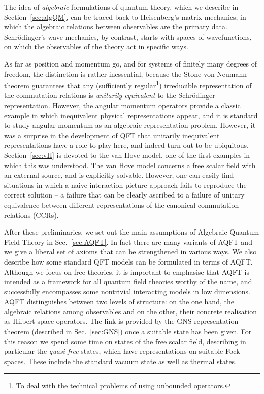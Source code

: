 \documentclass[12pt,a4paper]{article}
\newcommand{\1}{\mathds{1}}                         %
\begin{document}
	The idea of \emph{algebraic} formulations of quantum theory, which we describe in Section~\ref{sec:algQM}, can be traced
	back to Heisenberg's matrix mechanics, in which the algebraic relations between
	observables are the primary data. Schr\"odinger's wave mechanics, by contrast,
	starts with spaces of wavefunctions, on which the observables of the theory act in specific ways.
	
	As far as position and momentum go, and for systems of finitely many degrees of freedom, the distinction is rather inessential, because the Stone-von Neumann theorem guarantees that any (sufficiently regular\footnote{To deal with the technical problems of using unbounded operators.}) irreducible representation
	of the commutation relations is \emph{unitarily equivalent} to the Schr\"odinger representation. However, the angular momentum operators provide a classic example in which inequivalent physical representations appear, and it is standard
	to study angular momentum as an algebraic representation problem. 
	However, it was a surprise in the development of QFT that unitarily inequivalent representations have a role to play here, and indeed turn out to be ubiquitous. Section~\ref{sec:vH} is devoted to the van Hove model, one of the first examples in which this was understood. The van Hove model concerns a free scalar field with an external source, and is explicitly solvable. However, one can easily find situations in which a naive interaction picture approach fails to reproduce the correct solution -- a failure that can be clearly ascribed to a failure of unitary equivalence between different representations of the canonical commutation relations (CCRs).
	
	After these preliminaries, we set out the main assumptions of Algebraic Quantum Field Theory in Sec.~\ref{sec:AQFT}. In fact there are many variants of AQFT and we give a liberal set of axioms that can be strengthened in various ways. We also describe how some standard QFT models can be formulated in terms of AQFT. Although we focus on free theories, it is important to emphasise that AQFT is intended as a framework for all quantum field theories worthy of the name, and successfully encompasses some
	nontrivial interacting models in low dimensions. AQFT distinguishes between two levels of structure: on the one hand, the algebraic relations among observables and on the other, their concrete realisation as Hilbert space operators. The link is provided by the GNS representation theorem (described in Sec.~\ref{sec:GNS}) once a suitable state has been given. For this reason we spend some time on states of the free scalar field, describing in particular the \emph{quasi-free} states, which have representations on suitable Fock spaces. These include the standard vacuum state as well as thermal states.
	
\end{document}
